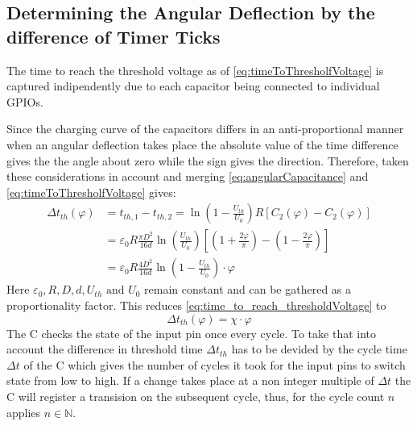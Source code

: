     \subsection*{Determining the Angular Deflection by the difference of Timer Ticks}
        The time to reach the threshold voltage as of \cref{eq:timeToThresholfVoltage} is captured indipendently due to
        each capacitor being connected to individual GPIOs.\par
        Since the charging curve of the capacitors differs in an anti-proportional manner when an angular deflection takes
        place the absolute value of the time difference gives the the angle about zero while the sign gives the direction.
        Therefore, taken these considerations in account and merging \cref{eq:angularCapacitance} and \cref{eq:timeToThresholfVoltage}
        gives:
        \begin{align}
            \Delta t_{th}(\varphi)   &= t_{th,1} - t_{th,2} = \ln\left( 1- \frac{U_{th}}{U_0} \right)R\left[ C_2(\varphi) - C_2(\varphi) \right] \nonumber \\
                            &= \varepsilon_0 R \frac{\pi D^2}{16d} \ln\left( \frac{U_{th}}{U_0} \right) \left[ \left( 1 + \frac{2\varphi}{\pi} \right) - \left( 1 - \frac{2\varphi}{\pi} \right) \right] \nonumber \\
                            &= \varepsilon_0 R \frac{4D^2}{16d} \ln\left( 1 - \frac{U_{th}}{U_0} \right) \cdot \varphi
            \label{eq:time_to_reach_thresholdVoltage}
        \end{align}
        Here \( \varepsilon_0, R, D, d, U_{th} \text{ and } U_0 \) remain constant and can be gathered as a proportionality
        factor. This reduces \cref{eq:time_to_reach_thresholdVoltage} to
        \begin{equation}
            \Delta t_{th}(\varphi) = \chi \cdot \varphi
            \label{eq:simplified_time_to_reach_thresholdVoltage}
        \end{equation}
        The \micro C checks the state of the input pin once every cycle. To take that into account the difference in threshold time
        \( \Delta t_{th} \) has to be devided by the cycle time \( \Delta t \) of the \micro C which gives the number of cycles it took for the
        input pins to switch state from low to high. If a change takes place at a non integer multiple of \( \Delta t \)
        the \micro C will register a transision on the subsequent cycle, thus, for the cycle count \( n \) applies \( n \in \mathbb{N} \).
